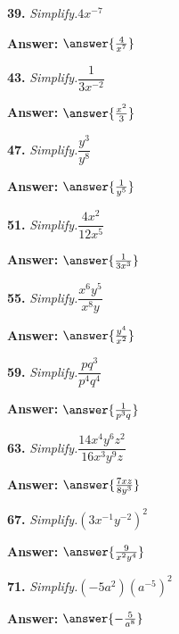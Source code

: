 \documentclass{ximera}
\begin{document}
\begin{problem}
\textbf{39.} \emph{Simplify.}\quad $4x^{-7}$

\textbf{Answer:} $\answer{\frac{4}{x^7}}$
\end{problem}

\begin{problem}
\textbf{43.} \emph{Simplify.}\quad $\dfrac{1}{3x^{-2}}$

\textbf{Answer:} $\answer{\frac{x^2}{3}}$
\end{problem}

\begin{problem}
\textbf{47.} \emph{Simplify.}\quad $\dfrac{y^3}{y^8}$

\textbf{Answer:} $\answer{\frac{1}{y^5}}$
\end{problem}

\begin{problem}
\textbf{51.} \emph{Simplify.}\quad $\dfrac{4x^2}{12x^5}$

\textbf{Answer:} $\answer{\frac{1}{3x^3}}$
\end{problem}

\begin{problem}
\textbf{55.} \emph{Simplify.}\quad $\dfrac{x^6y^5}{x^8y}$

\textbf{Answer:} $\answer{\frac{y^4}{x^2}}$
\end{problem}

\begin{problem}
\textbf{59.} \emph{Simplify.}\quad $\dfrac{pq^3}{p^4q^4}$

\textbf{Answer:} $\answer{\frac{1}{p^3q}}$
\end{problem}

\begin{problem}
\textbf{63.} \emph{Simplify.}\quad $\dfrac{14x^4y^6z^2}{16x^3y^9z}$

\textbf{Answer:} $\answer{\frac{7xz}{8y^3}}$
\end{problem}

\begin{problem}
\textbf{67.} \emph{Simplify.}\quad $\left(3x^{-1}y^{-2}\right)^2$

\textbf{Answer:} $\answer{\frac{9}{x^2y^4}}$
\end{problem}

\begin{problem}
\textbf{71.} \emph{Simplify.}\quad $\left(-5a^2\right)\left(a^{-5}\right)^2$

\textbf{Answer:} $\answer{-\frac{5}{a^8}}$
\end{problem}
\end{document}
